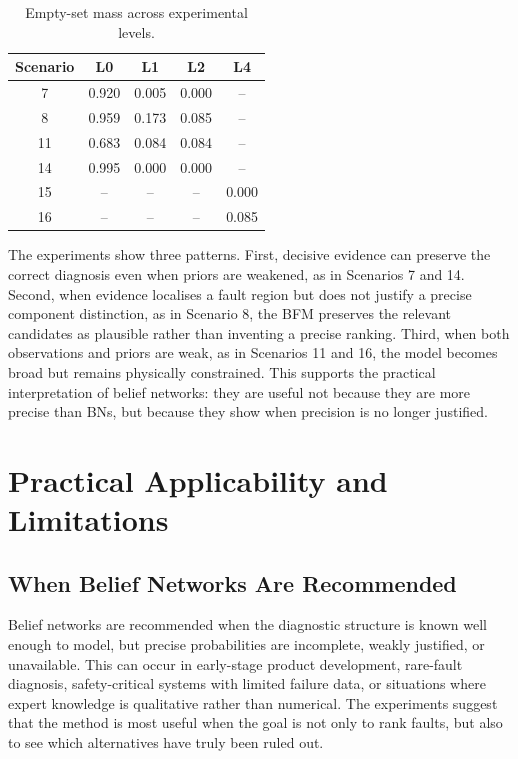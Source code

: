 \documentclass[runningheads]{llncs}
\begin{document}
\begin{table}[H]
\caption{Empty-set mass across experimental levels.}\label{tab:conflict_results}
\centering
\small
\begin{tabular}{ccccc}
\toprule
Scenario & L0 & L1 & L2 & L4 \\
\midrule
7  & 0.920 & 0.005 & 0.000 & -- \\
8  & 0.959 & 0.173 & 0.085 & -- \\
11 & 0.683 & 0.084 & 0.084 & -- \\
14 & 0.995 & 0.000 & 0.000 & -- \\
15 & --    & --    & --    & 0.000 \\
16 & --    & --    & --    & 0.085 \\
\bottomrule
\end{tabular}
\end{table}

The experiments show three patterns. First, decisive evidence can preserve the correct diagnosis even when priors are weakened, as in Scenarios 7 and 14. Second, when evidence localises a fault region but does not justify a precise component distinction, as in Scenario 8, the BFM preserves the relevant candidates as plausible rather than inventing a precise ranking. Third, when both observations and priors are weak, as in Scenarios 11 and 16, the model becomes broad but remains physically constrained. This supports the practical interpretation of belief networks: they are useful not because they are more precise than BNs, but because they show when precision is no longer justified.

\section{Practical Applicability and Limitations}
\label{sec:practical_guidance}

\subsection{When Belief Networks Are Recommended}
\label{sec:when_recommended}

Belief networks are recommended when the diagnostic structure is known well enough to model, but precise probabilities are incomplete, weakly justified, or unavailable. This can occur in early-stage product development, rare-fault diagnosis, safety-critical systems with limited failure data, or situations where expert knowledge is qualitative rather than numerical. The experiments suggest that the method is most useful when the goal is not only to rank faults, but also to see which alternatives have truly been ruled out.
\end{document}
